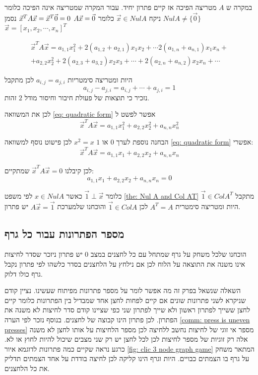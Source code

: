 \documentclass[12pt,twoside]{article}
\begin{document}
במקרה ש 
$A$
מטריצה הפיכה אז קיים פתרון יחיד.
עבור המקרה שמטריצה אינה הפיכה 
כלומר 
$Nul A \neq \{ \vec{0}\}$
ניקח 
$\vec{x} \in Nul A$
כלומר 
$A\vec{x} = \vec{0} \\$
$\vec{x}^T A \vec{x} = \vec{x}^T\vec{0} = 0 \\$
נסמן 
$\vec{x} = [x_1, x_2, \cdots, x_n]^T$

\begin{multline}
    \label{eq: quadratic form}
        \vec{x}^T A \vec{x} = a_{1,1}x_1^2 + 2(a_{1,2} + a_{2,1})x_1x_2 + \cdots 2(a_{1,n} + a_{n,1})x_1x_n + \\
        + a_{2,2}x_2^2 +  2(a_{2,3} + a_{3,2})x_2x_3 + \cdots  + 2(a_{2,n} + a_{n,2})x_2x_n + \cdots
\end{multline}

היות ומטריצה סימטריות
$a_{i,j} = a_{j,i}$
לכן
מתקבל
\[a_{i,j} - a_{j,i} = a_{i,j} + \cdots + a_{j,i} = 1 \]
נזכיר כי תוצאות של פעולת חיבור וחיסור מודל 
$2$
זהות.

לכן
את המשוואה 
\ref{eq: quadratic form}
אפשר לפשט ל
\[ \vec{x}^T A \vec{x} = a_{1,1}x_1^2 + a_{2,2} x_2^2 +  a_{n,n} x_n^2\]

הבחנה נוספת לערך 
$0$
או
$1$
$x^2 = x$
לכן פישוט נוסף למשוואה 
\ref{eq: quadratic form}
אפשרי:
\[ \vec{x}^T A \vec{x} = a_{1,1}x_1 + a_{2,2} x_2 +  a_{n,n} x_n\]

לכן קיבלנו 
$ \vec{x}^T A \vec{x} = 0$
שמתקיים:
\[a_{1,1}x_1 + a_{2,2} x_2 +  a_{n,n} x_n = 0\]

כלומר 
$\vec{1} \perp  \vec{x}$
כאשר 
$x \in Nul A$
לפי משפט 
\ref{the: Nul A and Col AT}
מתקבל 
$\vec{1} \in Col A^T$
היות ומטריצה סימטרית 
$A^T = A$
לכן
$\vec{1} \in Col A$
והוכחנו שלמערכת
$A\vec{x} = \vec{1}$
יש פתרון.

\subsection{מספר הפתרונות עבור כל גרף}
הוכחנו שלכל משחק על גרף שמתחל עם כל לחצנים במצב 
$0$
יש פתרון ניזכר שסדר לחיצות
אינו משנה את התוצאה על הלוח לכן אם נילחץ על הלחצנים בסדר כלשהו 
לפי פתרון נקבל גרף כולו דלוק.

השאלה  שנשאל בפרק זה מה אפשר לומר על מספר פתרונות מפיתוח שעשינו.
נציין קודם שניקרא לשני פתרונות שונים אם קיים לפחות לחצן אחד שמבדיל בין הפתרונות 
כלומר קיים לחצן ששייך לפתרון ראשון ולא שייך לפתרון שני כפי שציינו קודם סדר
לחיצות לא משנה את הפתרון.
לכן פתרון הינו קבוצה של לחצנים.
בנוסף נזכר לפי הערה
\ref{comm: press is uneven presses}
מספר אי זוגי של לחיצות נחשב ללחיצה לכן מספר הלחיצות על אותו לחצן לא משנה 
אלה רק זוגיות של מספר לחיצות 
לכן לכל לחצן יש רק שני מצבים שיכול להיות 
לחוץ 
או לא.
כרגע נראה שקיים כמה פתרונות לדוגמא 
איור
\ref{fig: clic 3 node graph game}
המתאר משחק על גרף בו הצמתים כבויים.
היות וגרף הינו קליקה לכן לחיצה בודדת על אחד הצמתים תדליק את כל הלחצנים.
\end{document}
